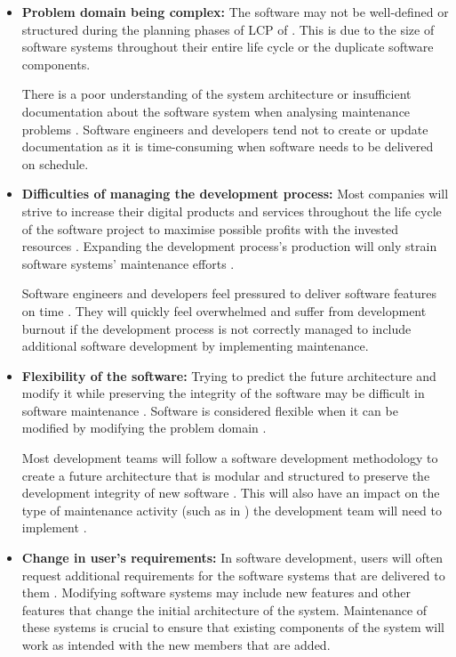 \begin{itemize}
	\item \textbf{Problem domain being complex:} The software may not be well-defined or structured during the planning phases of LCP of . This is due to the size of software systems throughout their entire life cycle or the duplicate software components. \par There is a poor understanding of the system architecture or insufficient documentation about the software system when analysing maintenance problems \cite{Galster2019}. Software engineers and developers tend not to create or update documentation as it is time-consuming when software needs to be delivered on schedule.
	\item \textbf{Difficulties of managing the development process:} Most companies will strive to increase their digital products and services throughout the life cycle of the software project to maximise possible profits with the invested resources \cite{Niu2018}. Expanding the development process's production will only strain software systems' maintenance efforts \cite{Sneed2004}. \par Software engineers and developers feel pressured to deliver software features on time \cite{Galster2019, Lenarduzzi2017}. They will quickly feel overwhelmed and suffer from development burnout if the development process is not correctly managed to include additional software development by implementing maintenance.
	\item \textbf{Flexibility of the software:} Trying to predict the future architecture and modify it while preserving the integrity of the software may be difficult in software maintenance \cite{Garlan1999}. Software is considered flexible when it can be modified by modifying the problem domain \cite{Ogheneovo2014}. \par Most development teams will follow a software development methodology to create a future architecture that is modular and structured to preserve the development integrity of new software \cite{Vijayasarathy2016}. This will also have an impact on the type of maintenance activity (such as in ) the development team will need to implement \cite{Thamburaj2017, Snipes2018}.
	\item \textbf{Change in user's requirements:} In software development, users will often request additional requirements for the software systems that are delivered to them \cite{Ogheneovo2014}. Modifying software systems may include new features and other features that change the initial architecture of the system. Maintenance of these systems is crucial to ensure that existing components of the system will work as intended with the new members that are added.

\end{itemize}
